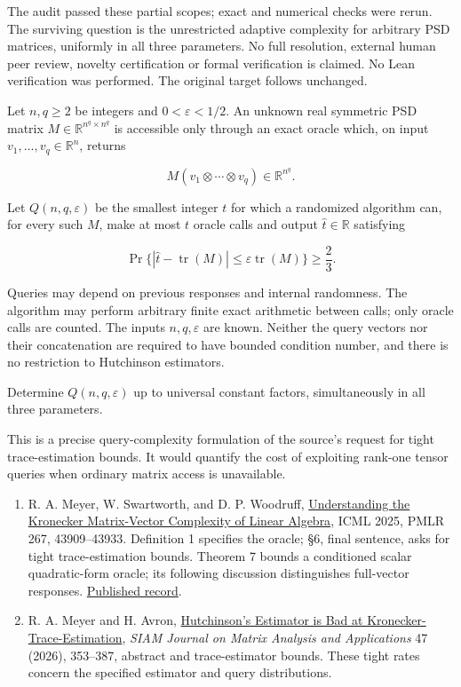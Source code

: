 \documentclass[11pt,a4paper]{article}
\makeatletter
\providecommand{\tightlist}{\setlength{\itemsep}{0pt}\setlength{\parskip}{0pt}}
\renewcommand{\subsection}{\Needspace{4\baselineskip}\@startsection{subsection}{2}{0pt}{9pt plus 1pt minus 1pt}{3pt}{\sffamily\bfseries\normalsize\color{ink}}}
\makeatother
\begin{document}
The audit passed these partial scopes; exact and numerical checks were
rerun. The surviving question is the unrestricted adaptive complexity
for arbitrary PSD matrices, uniformly in all three parameters. No full
resolution, external human peer review, novelty certification or formal
verification is claimed. No Lean verification was performed. The
original target follows unchanged.

Let \(n,q\ge2\) be integers and \(0<\varepsilon<1/2\). An unknown real
symmetric PSD matrix \(M\in\mathbb R^{n^q\times n^q}\) is accessible
only through an exact oracle which, on input
\(v_1,\ldots,v_q\in\mathbb R^n\), returns

\[M(v_1\otimes\cdots\otimes v_q)\in\mathbb R^{n^q}.\]

Let \(Q(n,q,\varepsilon)\) be the smallest integer \(t\) for which a
randomized algorithm can, for every such \(M\), make at most \(t\)
oracle calls and output \(\widehat t\in\mathbb R\) satisfying

\[\Pr\bigl\{|\widehat t-\mathop{\mathrm{tr}}\nolimits(M)|\le\varepsilon\mathop{\mathrm{tr}}\nolimits(M)\bigr\}\ge\frac23.\]

Queries may depend on previous responses and internal randomness. The
algorithm may perform arbitrary finite exact arithmetic between calls;
only oracle calls are counted. The inputs \(n,q,\varepsilon\) are known.
Neither the query vectors nor their concatenation are required to have
bounded condition number, and there is no restriction to Hutchinson
estimators.

Determine \(Q(n,q,\varepsilon)\) up to universal constant factors,
simultaneously in all three parameters.

This is a precise query-complexity formulation of the source's request
for tight trace-estimation bounds. It would quantify the cost of
exploiting rank-one tensor queries when ordinary matrix access is
unavailable.

\subsection{References}\label{references}

\begin{enumerate}
\def\labelenumi{\arabic{enumi}.}
\tightlist
\item
  R. A. Meyer, W. Swartworth, and D. P. Woodruff,
  \href{https://arxiv.org/html/2502.08029v2}{Understanding the Kronecker
  Matrix-Vector Complexity of Linear Algebra}, ICML 2025, PMLR 267,
  43909--43933. Definition 1 specifies the oracle; §6, final sentence,
  asks for tight trace-estimation bounds. Theorem 7 bounds a conditioned
  scalar quadratic-form oracle; its following discussion distinguishes
  full-vector responses.
  \href{https://proceedings.mlr.press/v267/meyer25a.html}{Published
  record}.
\item
  R. A. Meyer and H. Avron,
  \href{https://arxiv.org/abs/2309.04952}{Hutchinson's Estimator is Bad
  at Kronecker-Trace-Estimation}, \emph{SIAM Journal on Matrix Analysis
  and Applications} 47 (2026), 353--387, abstract and trace-estimator
  bounds. These tight rates concern the specified estimator and query
  distributions.
\end{enumerate}
\end{document}

